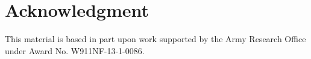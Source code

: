 \documentclass[conference]{IEEEtran}
\begin{document}
{%
%








\section*{Acknowledgment}


This material is based in part upon work
supported by the Army Research Office
under Award No. W911NF-13-1-0086.






\nocite{*}



}
\end{document}
